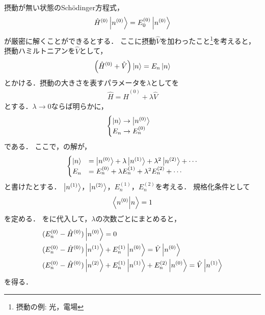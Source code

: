 \documentclass{report}
\begin{document}
  摂動が無い状態のSch\"odinger方程式，
  \begin{align}
    \hat{H}^{(0)}\ket{n^{(0)}}=E_0^{(0)}\ket{n^{(0)}}
  \end{align}
  が厳密に解くことができるとする．
  ここに摂動$\hat{V}$を加わったこと\footnote{摂動の例: 光，電場}を考えると，摂動ハミルトニアンを$\hat{V}$として，
  \begin{align}
    \qty(\hat{H}^{(0)} + \hat{V})\ket{n} = E_n\ket{n}\label{perturbation-origin}
  \end{align}
  とかける．摂動の大きさを表すパラメータを$\lambda$としてを
  \begin{align}
    \hat{H} = \hat{H}^{(0)} + \lambda\hat{V}\label{perturbation-using-lambda}
  \end{align}
  とする．$\lambda\to 0$ならば明らかに，
  \begin{align}
    \begin{cases}
      \ket{n}\to\ket{n^{(0)}}\\
      E_n\to E_n^{(0)}
    \end{cases}
  \end{align}
  である．
  ここで，の解が，%
  \begin{align}
    \begin{cases}
      \ket{n} &= \ket{n^{(0)}} + \lambda\ket{n^{(1)}} + \lambda^2\ket{n^{(2)}} + \cdots \label{n-en-expantion} \\
      E_n &= E_n^{(0)} + \lambda E_n^{(1)} + \lambda^2 E_n^{(2)} + \cdots 
    \end{cases}
  \end{align}
  と書けたとする．
  $\ket{n^{(1)}}$，$\ket{n^{(2)}}$，$E_n^{(1)}$，$E_n^{(2)}$を考える．
  規格化条件として
  \begin{align}
    \braket{n^{(0)}}{n} = 1
  \end{align}
  を定める．
  をに代入して，$\lambda$の次数ごとにまとめると，
  \begin{align}
    &(E_n^{(0)} - \hat{H}^{(0)})\ket{n^{(0)}} = 0 \label{0-order} \\ 
    &(E_n^{(0)} - \hat{H}^{(0)})\ket{n^{(1)}} + E_n^{(1)}\ket{n^{(0)}} = \hat{V}\ket{n^{(0)}} \label{1st-perturbation} \\
    &(E_n^{(0)} - \hat{H}^{(0)})\ket{n^{(2)}} + E_n^{(1)}\ket{n^{(1)}} + E_n^{(2)}\ket{n^{(0)}} = \hat{V}\ket{n^{(1)}} \label{2nd-perturbation}\\
  \end{align}
  を得る．
\end{document}
